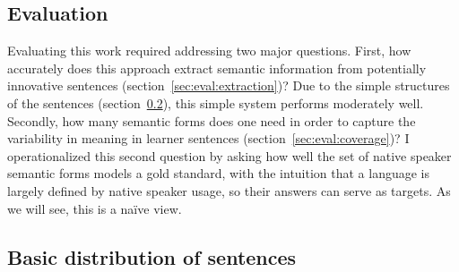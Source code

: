 \subsection{Evaluation}
\label{sec:evaluation}

Evaluating this work required addressing two major questions.  First,
how accurately does this approach extract semantic information from potentially
innovative sentences (section~\ref{sec:eval:extraction})?  Due to the
simple structures of the sentences
(section~\ref{sec:sentence-distribution}), this simple system performs moderately well.
Secondly, how many semantic forms does one need in
order to capture the variability in meaning in learner sentences
(section~\ref{sec:eval:coverage})? I operationalized this second
question by asking how well the set of native speaker semantic forms
models a gold standard, with the intuition that a language is largely defined
by native speaker usage, so their answers can serve as targets.  As we
will see, this is a na\"ive view.
\subsection{Basic distribution of sentences}
\label{sec:sentence-distribution}

